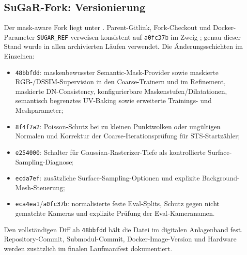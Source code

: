 \subsection*{SuGaR-Fork: Versionierung}

Der mask-aware Fork liegt unter . Parent-Gitlink,
Fork-Checkout und Docker-Parameter \texttt{SUGAR\_REF} verweisen konsistent
auf \texttt{a0fc37b} im Zweig ; genau dieser
Stand wurde in allen archivierten Läufen verwendet. Die Änderungsschichten im
Einzelnen:

\begin{itemize}
  \item \texttt{48bbfdd}: maskenbewusster Semantic-Mask-Provider sowie
    maskierte RGB-/DSSIM-Supervision in den Coarse-Trainern und im Refinement,
    maskierte DN-Consistency, konfigurierbare Maskenstufen/Dilatationen,
    semantisch begrenztes UV-Baking sowie erweiterte Trainings- und
    Meshparameter;
  \item \texttt{8f4f7a2}: Poisson-Schutz bei zu kleinen Punktwolken oder
    ungültigen Normalen und Korrektur der Coarse-Iterationsprüfung für
    STS-Startzähler;
  \item \texttt{e254000}: Schalter für Gaussian-Rasterizer-Tiefe als
    kontrollierte Surface-Sampling-Diagnose;
  \item \texttt{ecda7ef}: zusätzliche Surface-Sampling-Optionen und explizite
    Background-Mesh-Steuerung;
  \item \texttt{eca4ea1}/\texttt{a0fc37b}: normalisierte feste Eval-Splits,
    Schutz gegen nicht gematchte Kameras und explizite Prüfung der
    Eval-Kameranamen.
\end{itemize}

Den vollständigen Diff ab \texttt{48bbfdd} hält die Datei
 im digitalen Anlagenband fest.
Repository-Commit, Submodul-Commit, Docker-Image-Version und Hardware werden
zusätzlich im finalen Laufmanifest dokumentiert.
